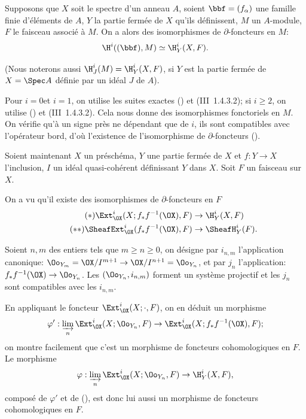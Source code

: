 \begin{supproposition} \label{II.5}
Supposons que $X$ soit le spectre d'un anneau $A$, soient $\bbf=(f_{\alpha})$ une famille finie d'\'el\'ements de $A$, $Y$ la partie ferm\'ee de $X$ qu'ils d\'efinissent, $M$ un $A$-module, $F$ le faisceau associ\'e \`a $M$. On a alors des isomorphismes de $\partial$-foncteurs en $M$:
\begin{equation} \label{eq:II.5.1} \H^i((\bbf), M) \simeq \H_Y^i(X, F).
\end{equation}
\end{supproposition}

\noindent
(Nous noterons aussi $\H_J^i(M)=\H_Y^i(X, F)$, si $Y$ est la partie ferm\'ee de $X=\Spec A$ d\'efinie par un id\'eal $J$ de $A$).

Pour $i=0$\pageoriginale et $i=1$, on utilise les suites exactes () et (\EGA III~1.4.3.2); si $i\geq2$, on utilise () et (\EGA III~1.4.3.2). Cela nous donne des isomorphismes fonctoriels en $M$. On v\'erifie qu'\`a un signe pr\`es ne d\'ependant que de $i$, ils sont compatibles avec l'op\'erateur bord, d'o\`u l'existence de l'isomorphisme de $\partial$-foncteurs ().

Soient maintenant $X$ un pr\'esch\'ema, $Y$ une partie ferm\'ee de $X$ et $f:Y\to X$ l'inclusion, $I$ un id\'eal quasi-coh\'erent d\'efinissant $Y$ dans $X$. Soit $F$ un faisceau sur $X$.

On a vu qu'il existe des isomorphismes de $\partial$-foncteurs en $F$
\begin{align}
\label{eq:II.5.*} \tag{$*$} \Ext_{\OX}^i(X;f_{*}f^{-1}(\OX), F) &\to \H_Y^i(X, F) \\
\label{eq:II.5.**} \tag{$**$} \SheafExt_{\OX}^i(f_{*}f^{-1}(\OX), F) &\to \SheafH_Y^i(F).
\end{align}

Soient $n, m$ des entiers tels que $m\geq n\geq 0$, on d\'esigne par $i_{n, m}$ l'application canonique: $\Oo_{Y_m}=\OX/I^{m+1} \to\OX/I^{n+1}=\Oo_{Y_n}$, et par $j_n$ l'application: $f_{*}f^{-1}(\OX)\to\Oo_{Y_n}$. Les $(\Oo_{Y_n}, i_{n, m})$ forment un syst\`eme projectif et les $j_n$ sont compatibles avec les $i_{n, m}$.

En appliquant le foncteur $\Ext_{\OX}^i(X;\cdot, F)$, on en d\'eduit un morphisme
$$
\varphi': \varinjlim_{n} \Ext_{\OX}^i(X;\Oo_{Y_n}, F) \to \Ext_{\OX}^i(X;f_{*}f^{-1}(\OX), F);
$$
on montre facilement que c'est un morphisme de foncteurs cohomologiques en $F$. Le morphisme
$$
\varphi: \varinjlim_{n} \Ext_{\OX}^i(X;\Oo_{Y_n}, F) \to \H_Y^i(X, F),
$$
compos\'e de $\varphi'$ et de (), est donc lui aussi un morphisme de foncteurs cohomologiques en $F$.

